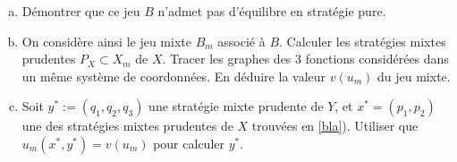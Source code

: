 \documentclass[french,11pt,leqno]{article}
\begin{document}
\begin{enumerate}[a)]%
\item D\'emontrer que ce jeu $B$ n'admet pas d'\'equilibre en strat\'egie pure.
\item On consid\`ere ainsi le jeu mixte $B_m$ associ\'e \`a $B$.
Calculer les strat\'egies mixtes prudentes $P_X \subset X_m$ de $X$. 
       Tracer les graphes des 3 fonctions consid\'er\'ees dans un m\^eme syst\`eme de coordonn\'ees.
      En d\'eduire la valeur $v(u_m)$ du jeu mixte. \label{bla}
\item Soit $y^*:=(q_1, q_2, q_3)$ une strat\'egie mixte prudente de $Y$, et $x^* = (p_1,p_2)$ une des strat\'egies
   mixtes prudentes de $X$ trouv\'ees en \ref{bla}). Utiliser que $u_m (x^*, y^*) = v(u_m)$ pour calculer $y^*$.
\end{enumerate}
\end{document}
